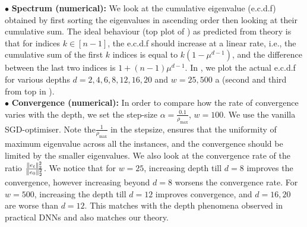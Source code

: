 $\bullet$ \textbf{Spectrum (numerical):} We look at the cumulative eigenvalue (e.c.d.f) obtained by first sorting the eigenvalues in ascending order then looking at their cumulative sum. The ideal behaviour (top plot of ) as predicted from theory is that for indices $k\in[n-1]$, the e.c.d.f should increase at a linear rate, i.e., the cumulative sum of the first $k$ indices is equal to $k(1-\mu^{d-1})$, and the difference between the last two indices is $1+(n-1)\mu^{d-1}$. In , we plot the actual e.c.d.f for various depths $d=2,4,6,8,12,16,20$ and $w=25,500$ a (second and third from top in ). \hfill\\
$\bullet$ \textbf{Convergence (numerical):} In order to compare how the rate of convergence varies with the depth, we set the step-size $\alpha=\frac{0.1}{\rho_{\max}}$, $w=100$. We use the vanilla SGD-optimiser. Note the$ \frac{1}{\rho_{\max}}$ in the stepsize, ensures that the uniformity of maximum eigenvalue across all the instances, and the convergence should be limited by the smaller eigenvalues. We also look at the convergence rate of the ratio $\frac{\|e_t\|^2_2}{\|e_0\|^2_2}$. We notice that for $w=25$, increasing depth till $d=8$ improves the convergence, however increasing beyond $d=8$ worsens the convergence rate. For $w=500$, increasing the depth till $d=12$ improves convergence, and $d=16,20$ are worse than $d=12$.  This matches with the depth phenomena observed in practical DNNs and also matches our theory.

